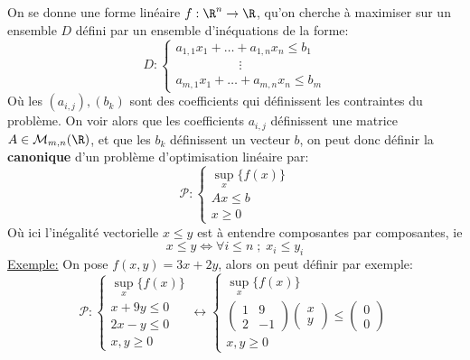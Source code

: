 \subsection*{}
On se donne une forme linéaire \( f : \R^n \rightarrow \R \), qu'on cherche à maximiser sur un ensemble \( D \) défini par un ensemble d'inéquations de la forme:
\[ 
   D : \begin{cases}
      a_{1, 1}x_1 + \ldots + a_{1, n}x_n \leq b_1\\
      \quad\quad\quad\quad\quad \vdots\\
      a_{m, 1}x_1 + \ldots + a_{m, n}x_n \leq b_m
   \end{cases} 
\]
Où les \( (a_{i,j}), (b_k) \) sont des coefficients qui définissent les contraintes du problème. On voir alors que les coefficients \( a_{i,j} \) définissent une matrice \(A \in \mathcal{M}_{m, n}(\R)\), et que les \( b_k \) définissent un vecteur \( b \), on peut donc définir la \textbf{canonique} d'un problème d'optimisation linéaire par:
\[ 
   \mathcal{P} : \begin{cases}
      \sup_x\{f(x)\}\\
      Ax \leq b\\
      x \geq 0
   \end{cases}
\]
Où ici l'inégalité vectorielle \( x \leq y \) est à entendre composantes par composantes, ie 
\[ 
   x \leq y \iff \forall i \leq n \; ; \; x_i \leq y_i
\]
\uline{Exemple:} On pose \( f(x, y) = 3x + 2y \), alors on peut définir par exemple:
\[ 
   \mathcal{P} : \begin{cases}
      \sup_x\{f(x)\} \\
      x + 9y \leq 0 \\
      2x - y \leq 0 \\
      x, y \geq 0
   \end{cases} \longleftrightarrow 
   \begin{cases}
      \sup_x\{f(x)\} \\
      \begin{pmatrix}
      1 & 9\\
      2 & -1
      \end{pmatrix} \begin{pmatrix} x \\ y  \end{pmatrix} \leq \begin{pmatrix} 0 \\ 0\end{pmatrix}\\
      x, y \geq 0
   \end{cases}
\]

